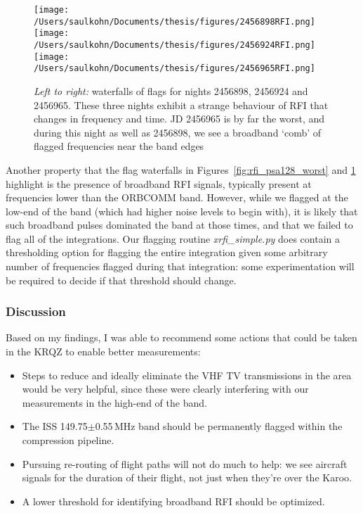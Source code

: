 \begin{figure}
\centering
\texttt{[image: /Users/saulkohn/Documents/thesis/figures/2456898RFI.png]}
\texttt{[image: /Users/saulkohn/Documents/thesis/figures/2456924RFI.png]}
\texttt{[image: /Users/saulkohn/Documents/thesis/figures/2456965RFI.png]}
\caption[Waterfalls of RFI flags for nights 2456898, 2456924 and 2456965]{\textit{Left to right:} waterfalls of flags for nights 2456898, 2456924 and 2456965. These three nights exhibit a strange behaviour of RFI that changes in frequency and time. JD 2456965 is by far the worst, and during this night as well as 2456898, we see a broadband `comb' of flagged frequencies near the band edges}
\label{fig:rfi_psa128_wandering}
\end{figure}

Another property that the flag waterfalls in Figures~\ref{fig:rfi_psa128_worst} and \ref{fig:rfi_psa128_wandering} highlight is the presence of broadband RFI signals, typically present at frequencies lower than the ORBCOMM band. However, while we flagged at the low-end of the band (which had higher noise levels to begin with), it is likely that such broadband pulses dominated the band at those times, and that we failed to flag all of the integrations. Our flagging routine \textit{xrfi\_simple.py} does contain a thresholding option for flagging the entire integration given some arbitrary number of frequencies flagged during that integration: some experimentation will be required to decide if that threshold should change.

\subsubsection{Discussion}
\label{subsubsec:rfi_paper128_conc}

Based on my findings, I was able to recommend some actions that could be taken in the KRQZ to enable better measurements:
\begin{itemize}
\item  Steps to reduce and ideally eliminate the VHF TV transmissions in the area would be very helpful, since these were clearly interfering with our measurements in the high-end of the band.
\item The ISS 149.75$\pm$0.55\,MHz band should be permanently flagged within the compression pipeline.
\item Pursuing re-routing of flight paths will not do much to help: we see aircraft signals for the duration of their flight, not just when they're over the Karoo.
\item A lower threshold for identifying broadband RFI should be optimized.
\end{itemize}

